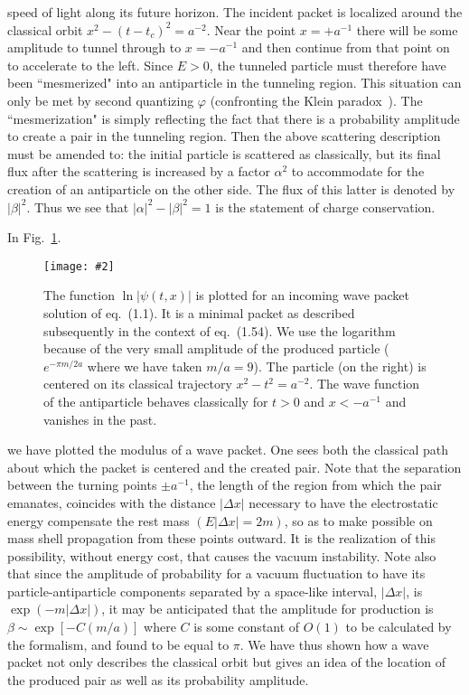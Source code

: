 \documentclass[12pt,oneside]{report}
\newcommand{\dessin}[4]
{\begin{figure}[tp]\begin{center}
\texttt{[image: \#2]}%
\end{center}
\caption{#4}
\label{#3}
\end{figure}}
\begin{document}
speed of light along its future horizon.  The incident  packet is
 localized around the classical orbit
$x^2 - \left(t-t_c\right)^2 = a^{-2}$.  Near the point $x =+a^{-1}$
there will be some amplitude  to tunnel through to
$x = - a^{-1}$ and then continue from that point on to
accelerate to the left.  Since $E > 0$, the tunneled particle
must therefore have been ``mesmerized" into an antiparticle
in the tunneling region.  This situation can only be met
by second quantizing $\varphi$ (confronting the Klein
paradox~\cite{Klein}).  The ``mesmerization" is simply reflecting the fact
that there is a probability amplitude to create 
a pair in the tunneling region.  Then the
above scattering
description must be amended to: the initial particle is scattered
as classically, but its final flux after the scattering is increased
by a factor $\alpha^2$ to accommodate  for the creation of an
antiparticle on the other side. The flux of this latter is
denoted by $|\beta|^2$.  Thus we see that $|\alpha|^2 -
|\beta|^2 = 1$ is the statement of charge conservation.
\par 
In Fig.~\ref{F1}.
\dessin{1.000}{NFIG11.eps}{F1}{The function $\ln \vert \psi(t,x)\vert$ is plotted for an incoming
wave packet solution of eq.~(1.1). It is a minimal packet as described
subsequently in the context of eq.~(1.54). We use the logarithm
because of the very small amplitude of the produced particle ($e^{-\pi m / 2 a}$
where we have taken $m/a = 9$). The particle (on the right) is centered on its
classical trajectory $x^2 - t^2 = a^{-2}$. The wave function of the antiparticle
behaves classically for $t>0$ and $x<-a^{-1}$ and vanishes in the past.}
we have plotted the modulus of a wave packet. One sees both the
classical path about which the packet is centered 
and the created pair.  
Note that the separation between the
turning points $\pm a^{-1}$, the length of the region from which the pair
emanates, coincides with
the distance $|\Delta x|$ necessary to have the electrostatic energy
compensate the rest mass $( E |\Delta x|=2m)$, so as to make
possible on mass shell propagation from these points outward.
It is the realization of this possibility, without energy cost, that causes
the vacuum instability.  Note also that since the amplitude of probability
for a vacuum fluctuation to have its particle-antiparticle
components separated by a space-like interval,
$|\Delta x|$, is $\exp (- m|\Delta x|)$, it may be anticipated that the
amplitude for production is
$\beta \sim \exp \left[-C(m/a)\right]$ where $C$
is some constant of $O(1)$ to be calculated by the formalism, and found to 
be equal to $\pi$. We have thus shown how a wave packet not only describes
 the classical
orbit but gives an idea of the location of the produced pair 
as well as its  probability amplitude.
\end{document}
